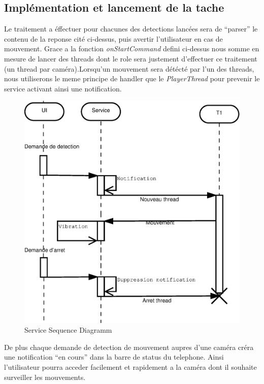 \subsection{Implémentation et lancement de la tache}
Le traitement a éffectuer pour chacunes des detections lancées sera de
``parser'' le contenu de la reponse cité ci-dessus, puis avertir l'utilisateur en cas de mouvement.
Grace a la fonction \textit{onStartCommand} defini ci-dessus nous somme en
mesure de lancer des threads dont le role sera justement d'effectuer ce
traitement (un thread par caméra).\newline Lorsqu'un mouvement sera détécté
par l'un des threads, nous utiliserons le meme principe de handler que le
\textit{PlayerThread} pour prevenir le service activant ainsi une notification.
\begin{figure}[H]
  \label{service}
  \centering
   \includegraphics[scale=0.4]{Images/service.eps}
  \caption{Service Sequence Diagramm}
\end{figure}  
\indent De plus chaque demande de detection de mouvement aupres d'une
caméra créra une notification ``en cours'' dans la barre de status du telephone.
Ainsi l'utilisateur pourra acceder facilement et rapidement a la caméra dont il
souhaite surveiller les mouvements.

